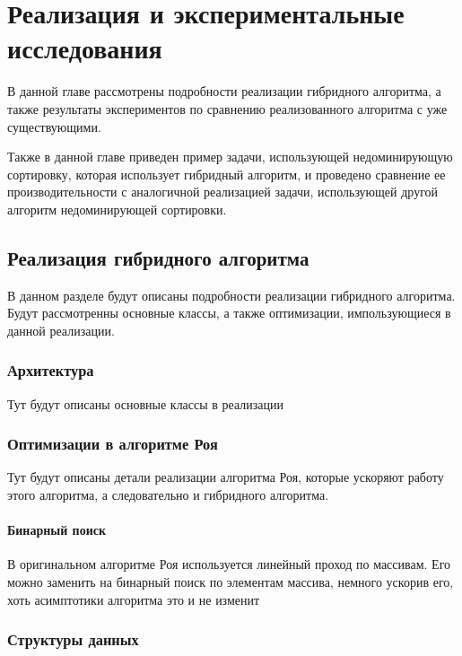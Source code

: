 \chapter{Реализация и экспериментальные исследования}
\label{chapter3}

В данной главе рассмотрены подробности реализации гибридного алгоритма, а также результаты экспериментов по сравнению
реализованного алгоритма с уже существующими.

Также в данной главе приведен пример задачи, использующей недоминирующую сортировку, которая использует гибридный
алгоритм, и проведено сравнение ее производительности с аналогичной реализацией задачи, использующей другой алгоритм
недоминирующей сортировки.

\section{Реализация гибридного алгоритма}

В данном разделе будут описаны подробности реализации гибридного алгоритма. Будут рассмотренны основные классы, а также
оптимизации, импользующиеся в данной реализации.

\subsection{Архитектура}

Тут будут описаны основные классы в реализации

\subsection{Оптимизации в алгоритме Роя}

Тут будут описаны детали реализации алгоритма Роя, которые ускоряют работу этого алгоритма, а следовательно и гибридного
алгоритма.

\subsubsection{Бинарный поиск}

В оригинальном алгоритме Роя используется линейный проход по массивам. %
Его можно заменить на бинарный поиск по элементам массива, немного ускорив его, хоть асимптотики алгоритма это и не
изменит

\subsection{Структуры данных}

